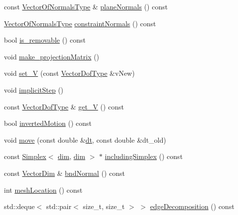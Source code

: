 \begin{DoxyCompactItemize}
\item 
const \hyperlink{classmodel_1_1_dislocation_node_a56f2de43c8df74c51f544b23f3b64540}{Vector\+Of\+Normals\+Type} \& \hyperlink{classmodel_1_1_dislocation_node_a4252608eb14d37e92cd8012d5a569e4c}{plane\+Normals} () const 
\item 
\hyperlink{classmodel_1_1_dislocation_node_a56f2de43c8df74c51f544b23f3b64540}{Vector\+Of\+Normals\+Type} \hyperlink{classmodel_1_1_dislocation_node_ac19dd8c59840f27cf4564a0e12d030c9}{constraint\+Normals} () const 
\item 
bool \hyperlink{classmodel_1_1_dislocation_node_ae5a00c855adf1fec2b42c3e6c888f2c9}{is\+\_\+removable} () const 
\item 
void \hyperlink{classmodel_1_1_dislocation_node_ac9d95969ed85b86c67d32dcc39fb61ae}{make\+\_\+projection\+Matrix} ()
\item 
void \hyperlink{classmodel_1_1_dislocation_node_a6adb2dcd3de9feeb38f336d5c460278a}{set\+\_\+\+V} (const \hyperlink{classmodel_1_1_dislocation_node_a7def555ec4b0751177d47d703c8f9282}{Vector\+Dof\+Type} \&v\+New)
\item 
void \hyperlink{classmodel_1_1_dislocation_node_ad8c110b3b1d1f6ebb83c31fcafef9344}{implicit\+Step} ()
\item 
const \hyperlink{classmodel_1_1_dislocation_node_a7def555ec4b0751177d47d703c8f9282}{Vector\+Dof\+Type} \& \hyperlink{classmodel_1_1_dislocation_node_a708ba6383ecab301c0d7592839b1fe72}{get\+\_\+\+V} () const 
\item 
bool \hyperlink{classmodel_1_1_dislocation_node_a372d9f9850df776354136d2c41272324}{inverted\+Motion} () const 
\item 
void \hyperlink{classmodel_1_1_dislocation_node_ae30516bfd693f7cf0c1b5370087e2432}{move} (const double \&\hyperlink{plot_stress_strain_8m_a770f288d3048ff6cbee9faa0969fd6b0}{dt}, const double \&dt\+\_\+old)
\item 
const \hyperlink{classmodel_1_1_simplex}{Simplex}$<$ \hyperlink{classmodel_1_1_dislocation_node_abba8c89236dd4715f60c798aa12873eb}{dim}, \hyperlink{classmodel_1_1_dislocation_node_abba8c89236dd4715f60c798aa12873eb}{dim} $>$ $\ast$ \hyperlink{classmodel_1_1_dislocation_node_a2afda22b6f2347a0cf6d64c1dd439f64}{including\+Simplex} () const 
\item 
const \hyperlink{classmodel_1_1_dislocation_node_a24f59a87745e7b05b151b5f5017172b0}{Vector\+Dim} \& \hyperlink{classmodel_1_1_dislocation_node_a9402d0942ab9fc5e3d00a4296928c949}{bnd\+Normal} () const 
\item 
int \hyperlink{classmodel_1_1_dislocation_node_a4c452b8306dbaf2d5b39db9151e9d299}{mesh\+Location} () const 
\item 
std\+::deque$<$ std\+::pair$<$ size\+\_\+t, size\+\_\+t $>$ $>$ \hyperlink{classmodel_1_1_dislocation_node_a7f1b8b136eb4c8967514180d1e0afdc8}{edge\+Decomposition} () const 
\end{DoxyCompactItemize}
